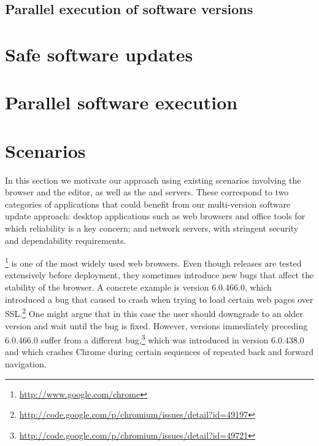 \subsection{Parallel execution of software versions}
%

\section{Safe software updates}

\section{Parallel software execution}

\section{Scenarios}
\label{multi-version:scenarios}

In this section we motivate our approach using existing scenarios involving the
\chrome browser and the \vim editor, as well as the \lighttpd and \vsftpd
servers.  These correspond to two categories of applications that could benefit
from our multi-version software update approach: desktop applications such as
web browsers and office tools for which reliability is a key concern; and
network servers, with stringent security and dependability requirements.



\gchrome\footnote{\url{http://www.google.com/chrome}} is one of the most widely
used web browsers.  Even though \chrome releases are tested extensively before
deployment, they sometimes introduce new bugs that affect the stability of the
browser.  A concrete example is version $6.0.466.0$, which introduced a bug
that caused \chrome to crash when trying to load certain web pages over
SSL.\footnote{\url{http://code.google.com/p/chromium/issues/detail?id=49197}}
One might argue that in this case the user should downgrade to an older version
and wait until the bug is fixed. However, versions immediately preceding
$6.0.466.0$ suffer from a different
bug,\footnote{\url{http://code.google.com/p/chromium/issues/detail?id=49721}}
which was introduced in version $6.0.438.0$ and which crashes Chrome during
certain sequences of repeated back and forward navigation.

